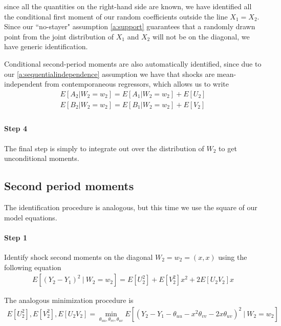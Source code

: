 \noindent since all the quantities on the right-hand side are known, we have identified all the conditional first moment of our random coefficients outside the line $X_1 = X_2$. Since our ``no-stayer" assumption \ref{a:support} guarantees that a randomly drawn point from the joint distribution of $X_1$ and $X_2$ will not be on the diagonal, we have generic identification.

Conditional second-period moments are also automatically identified, since due to our \ref{a:sequentialindependence} assumption we have that shocks are mean-independent from contemporaneous regressors, which allows us to write
\begin{align}
  E[A_2 | W_2 = w_2] = E[A_1|W_2 = w_2] + E[U_2] \\
  E[B_2 | W_2 = w_2] = E[B_1|W_2 = w_2] + E[V_2] \\
\end{align}

\paragraph{Step 4} The final step is simply to integrate out over the distribution of $W_2$ to get unconditional moments. 

\subsection{Second period moments} The identification procedure is analogous, but this time we use the square of our model equations.

\paragraph{Step 1} Identify shock second moments on the diagonal $W_2 = w_2 = (x, x)$ using the following equation
\begin{align}
  E[(Y_{2} - Y_{1})^2 \ | \  W_{2} = w_{2}] = 
  E[U_{2}^2] + E[V_{2}^2]x^2 + 2E[U_{2}V_{2}]x
\end{align}

\noindent The analogous minimization procedure is
\begin{align}
E[U_2^2], E[V_2^2], E[U_2V_2] =
  \min_{\theta_{uu}, \theta_{vv}, \theta_{uv}}  
  E[(Y_{2} - Y_{1} - \theta_{uu} -  x^2\theta_{vv} - 2x\theta_{uv})^2 \  | \ W_2 = w_2]
\end{align}

